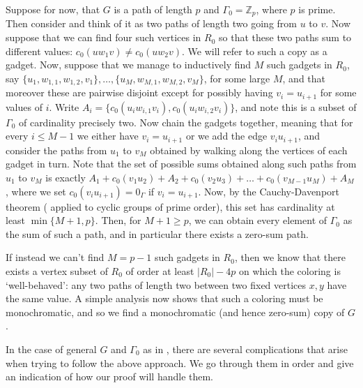 \documentclass{article}
\theoremstyle{definition}
\begin{document}
Suppose for now, that $G$ is a path of length $p$ and $\Gamma_0=\mathbb{Z}_p$, where $p$ is prime. Then consider  and think of it as two paths of length two going from $u$ to $v$. Now suppose that we can find four such vertices in $R_0$ so that these two paths sum to different values: $c_0(uw_1v)\neq c_0(uw_2v)$. We will refer to such a copy as a gadget. Now, suppose that we manage to inductively find $M$ such gadgets in $R_0$, say $\{u_1,w_{1,1},w_{1,2},v_1\},\ldots,\{u_M,w_{M,1},w_{M,2},v_M\}$, for some large $M$, and that moreover these are pairwise disjoint except for possibly having $v_i=u_{i+1}$ for some values of $i$. Write $A_i=\{c_0(u_iw_{i,1}v_i), c_0(u_iw_{i,2}v_i)\}$, and note this is a subset of $\Gamma_0$ of cardinality precisely two. Now chain the gadgets together, meaning that for every $i\leq M-1$ we either have $v_i=u_{i+1}$ or we add the edge $v_iu_{i+1}$, and consider the paths from $u_1$ to $v_M$ obtained by walking along the vertices of each gadget in turn. Note that the set of possible sums obtained along such paths from $u_1$ to $v_M$ is exactly $A_1+c_0(v_1u_2)+A_2+ c_0(v_2u_3)+\dots+c_0(v_{M-1}u_M)+A_M$, where we set $c_0(v_iu_{i+1})=0_\Gamma$ if $v_i=u_{i+1}$. Now, by the Cauchy-Davenport theorem ( applied to cyclic groups of prime order), this set has cardinality at least $\min\{M+1, p\}$. Then, for $M+1\geq p$, we can obtain every element of $\Gamma_0$ as the sum of such a path, and in particular there exists a zero-sum path.

If instead we can't find $M=p-1$ such gadgets in $R_0$, then we know that there exists a vertex subset of $R_0$ of order at least $|R_0|-4p$ on which the coloring is `well-behaved': any two paths of length two between two fixed vertices $x,y$ have the same value. A simple analysis now shows that such a coloring must be monochromatic, and so we find a monochromatic (and hence zero-sum) copy of $G$.

In the case of general $G$ and $\Gamma_0$ as in , there are several complications that arise when trying to follow the above approach. We go through them in order and give an indication of how our proof will handle them.
\end{document}
